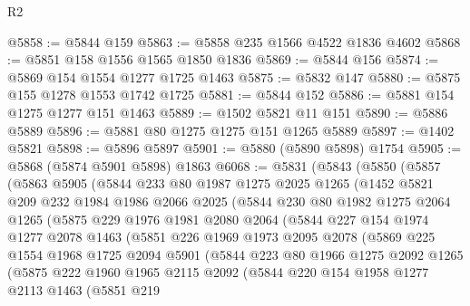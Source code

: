 \begin{lexlean}{R2}
\begin{coremodule}
@5858 := @5844 @159
@5863 := @5858 @235 @1566 @4522 @1836 @4602
@5868 := @5851 @158 @1556 @1565 @1850 @1836
@5869 := @5844 @156
@5874 := @5869 @154 @1554 @1277 @1725 @1463
@5875 := @5832 @147
@5880 := @5875 @155 @1278 @1553 @1742 @1725
@5881 := @5844 @152
@5886 := @5881 @154 @1275 @1277 @151 @1463
@5889 := @1502 @5821 @11 @151
@5890 := @5886 @5889
@5896 := @5881 @80 @1275 @1275 @151 @1265 @5889
@5897 := @1402 @5821
@5898 := @5896 @5897
@5901 := @5880 (@5890 @5898) @1754
@5905 := @5868 (@5874 @5901 @5898) @1863
@6068 := @5831
    (@5843
      (@5850
        (@5857
          (@5863
            @5905
            (@5844
              @233
              @80
              @1987
              @1275
              @2025
              @1265
              (@1452
                @5821
                @209
                @232
                @1984
                @1986
                @2066
                @2025
                (@5844
                  @230
                  @80
                  @1982
                  @1275
                  @2064
                  @1265
                  (@5875
                    @229
                    @1976
                    @1981
                    @2080
                    @2064
                    (@5844
                      @227
                      @154
                      @1974
                      @1277
                      @2078
                      @1463
                      (@5851
                        @226
                        @1969
                        @1973
                        @2095
                        @2078
                        (@5869
                          @225
                          @1554
                          @1968
                          @1725
                          @2094
                          @5901
                          (@5844
                            @223
                            @80
                            @1966
                            @1275
                            @2092
                            @1265
                            (@5875
                              @222
                              @1960
                              @1965
                              @2115
                              @2092
                              (@5844
                                @220
                                @154
                                @1958
                                @1277
                                @2113
                                @1463
                                (@5851
                                  @219

\end{coremodule}
\end{lexlean}
